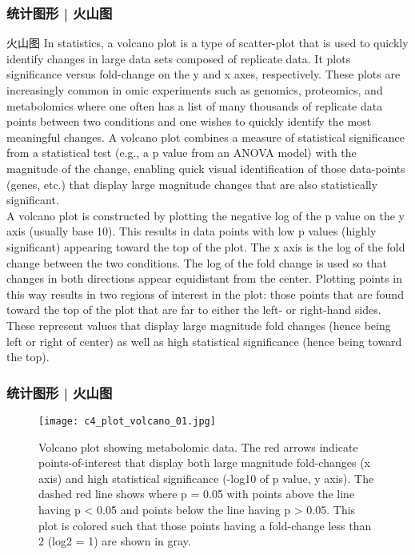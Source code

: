 \begin{frame}
  \frametitle{统计图形 | 火山图}
  \begin{block}{火山图}
    {\footnotesize
    In statistics, a volcano plot is a type of scatter-plot that is used to quickly identify changes in large data sets composed of replicate data. It plots significance versus fold-change on the y and x axes, respectively. These plots are increasingly common in omic experiments such as genomics, proteomics, and metabolomics where one often has a list of many thousands of replicate data points between two conditions and one wishes to quickly identify the most meaningful changes. A volcano plot combines a measure of statistical significance from a statistical test (e.g., a p value from an ANOVA model) with the magnitude of the change, enabling quick visual identification of those data-points (genes, etc.) that display large magnitude changes that are also statistically significant.\\
    \vspace{0.5em}
A volcano plot is constructed by plotting the negative log of the p value on the y axis (usually base 10). This results in data points with low p values (highly significant) appearing toward the top of the plot. The x axis is the log of the fold change between the two conditions. The log of the fold change is used so that changes in both directions appear equidistant from the center. Plotting points in this way results in two regions of interest in the plot: those points that are found toward the top of the plot that are far to either the left- or right-hand sides. These represent values that display large magnitude fold changes (hence being left or right of center) as well as high statistical significance (hence being toward the top).\\
    }
  \end{block}
\end{frame}

\begin{frame}
  \frametitle{统计图形 | 火山图}
  \begin{figure}
    \centering
    \texttt{[image: c4\_plot\_volcano\_01.jpg]}
    \caption{{\scriptsize Volcano plot showing metabolomic data. The red arrows indicate points-of-interest that display both large magnitude fold-changes (x axis) and high statistical significance (-log10 of p value, y axis). The dashed red line shows where p = 0.05 with points above the line having p < 0.05 and points below the line having p > 0.05. This plot is colored such that those points having a fold-change less than 2 (log2 = 1) are shown in gray.\\ }}
  \end{figure}
\end{frame}

